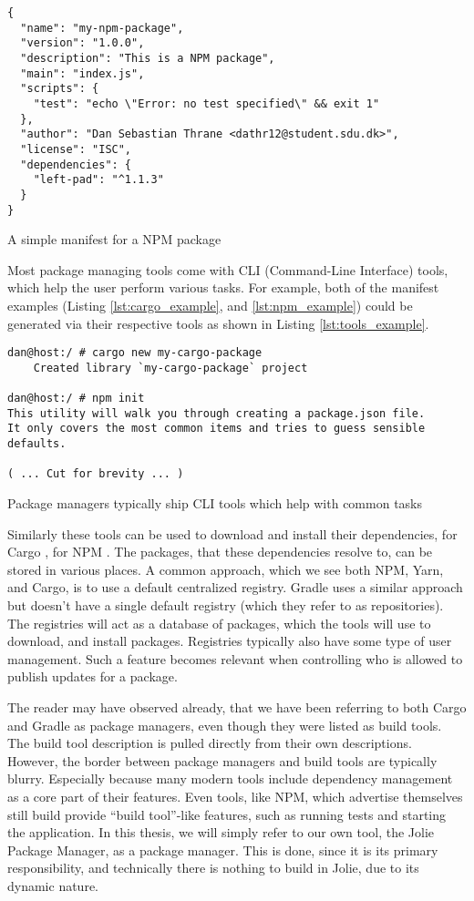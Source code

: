 \begin{listing}[H]
\begin{verbatim}
{
  "name": "my-npm-package",
  "version": "1.0.0",
  "description": "This is a NPM package",
  "main": "index.js",
  "scripts": {
    "test": "echo \"Error: no test specified\" && exit 1"
  },
  "author": "Dan Sebastian Thrane <dathr12@student.sdu.dk>",
  "license": "ISC",
  "dependencies": {
    "left-pad": "^1.1.3"
  }
}
\end{verbatim}
\caption{A simple manifest for a NPM package}
\label{lst:npm_example}
\end{listing}

Most package managing tools come with CLI (Command-Line Interface) tools, which
help the user perform various tasks. For example, both of the manifest examples
(Listing \ref{lst:cargo_example}, and \ref{lst:npm_example}) could be generated
via their respective tools as shown in Listing \ref{lst:tools_example}.

\begin{listing}[H]
\begin{verbatim}
dan@host:/ # cargo new my-cargo-package
    Created library `my-cargo-package` project

dan@host:/ # npm init
This utility will walk you through creating a package.json file.
It only covers the most common items and tries to guess sensible defaults.

( ... Cut for brevity ... )
\end{verbatim}
\caption{Package managers typically ship CLI tools which help with common
    tasks}
\label{lst:tools_example}
\end{listing}

Similarly these tools can be used to download and install their dependencies,
for Cargo , for NPM . The
packages, that these dependencies resolve to, can be stored in
various places. A common approach, which we see both NPM, Yarn, and Cargo, is
to use a default centralized registry. Gradle uses a similar approach but
doesn't have a single default registry (which they refer to as repositories).
The registries will act as a database of packages, which the tools will use
to download, and install packages. Registries typically also have some type of
user management. Such a feature becomes relevant when controlling who is
allowed to publish updates for a package.

The reader may have observed already, that we have been referring to both Cargo
and Gradle as package managers, even though they were listed as build tools.
The build tool description is pulled directly from their own descriptions.
However, the border between package managers and build tools are typically
blurry. Especially because many modern tools include dependency management as a
core part of their features. Even tools, like NPM, which advertise themselves
still build provide ``build tool''-like features, such as running tests and
starting the application. In this thesis, we will simply refer to our own tool,
the Jolie Package Manager, as a package manager. This is done, since
it is its primary responsibility, and technically there is nothing to
build in Jolie, due to its dynamic nature.
